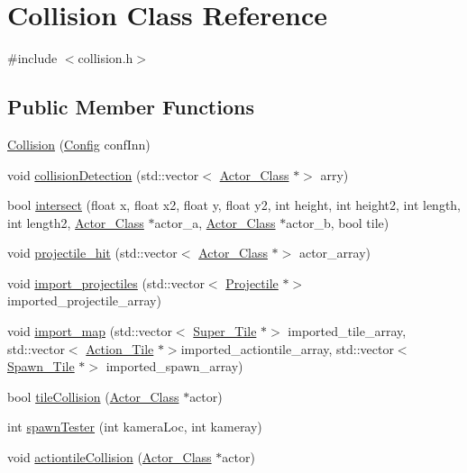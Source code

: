 \hypertarget{class_collision}{}\section{Collision Class Reference}
\label{class_collision}


{\ttfamily \#include $<$collision.\+h$>$}

\subsection*{Public Member Functions}
\begin{DoxyCompactItemize}
\item 
\hyperlink{class_collision_afb1cd1c725a04748829d2c1d813c2eec}{Collision} (\hyperlink{class_config}{Config} conf\+Inn)
\item 
void \hyperlink{class_collision_aee423e34a3e0afa46842928df3c39d54}{collision\+Detection} (std\+::vector$<$ \hyperlink{class_actor___class}{Actor\+\_\+\+Class} $\ast$$>$ arry)
\item 
bool \hyperlink{class_collision_ae7096111cf5b03b99fa74a8e424d3ff1}{intersect} (float x, float x2, float y, float y2, int height, int height2, int length, int length2, \hyperlink{class_actor___class}{Actor\+\_\+\+Class} $\ast$actor\+\_\+a, \hyperlink{class_actor___class}{Actor\+\_\+\+Class} $\ast$actor\+\_\+b, bool tile)
\item 
void \hyperlink{class_collision_a6705beb3ad1e1d3e2e882ca21af5a46f}{projectile\+\_\+hit} (std\+::vector$<$ \hyperlink{class_actor___class}{Actor\+\_\+\+Class} $\ast$$>$ actor\+\_\+array)
\item 
void \hyperlink{class_collision_afaaa2d44fbd17da3d3569133c04a9789}{import\+\_\+projectiles} (std\+::vector$<$ \hyperlink{class_projectile}{Projectile} $\ast$$>$ imported\+\_\+projectile\+\_\+array)
\item 
void \hyperlink{class_collision_aa5f6f529a4c59de675958a9bdf26b963}{import\+\_\+map} (std\+::vector$<$ \hyperlink{class_super___tile}{Super\+\_\+\+Tile} $\ast$$>$ imported\+\_\+tile\+\_\+array, std\+::vector$<$ \hyperlink{class_action___tile}{Action\+\_\+\+Tile} $\ast$$>$imported\+\_\+actiontile\+\_\+array, std\+::vector$<$ \hyperlink{class_spawn___tile}{Spawn\+\_\+\+Tile} $\ast$$>$ imported\+\_\+spawn\+\_\+array)
\item 
bool \hyperlink{class_collision_a31573f99490d4a5940ed2a1fc796289d}{tile\+Collision} (\hyperlink{class_actor___class}{Actor\+\_\+\+Class} $\ast$actor)
\item 
int \hyperlink{class_collision_ae9a5eceff1beb6584cafe16d10d59396}{spawn\+Tester} (int kamera\+Loc, int kameray)
\item 
void \hyperlink{class_collision_ad09862825e2bec3369c53dbbca1ed7fb}{actiontile\+Collision} (\hyperlink{class_actor___class}{Actor\+\_\+\+Class} $\ast$actor)
\end{DoxyCompactItemize}
